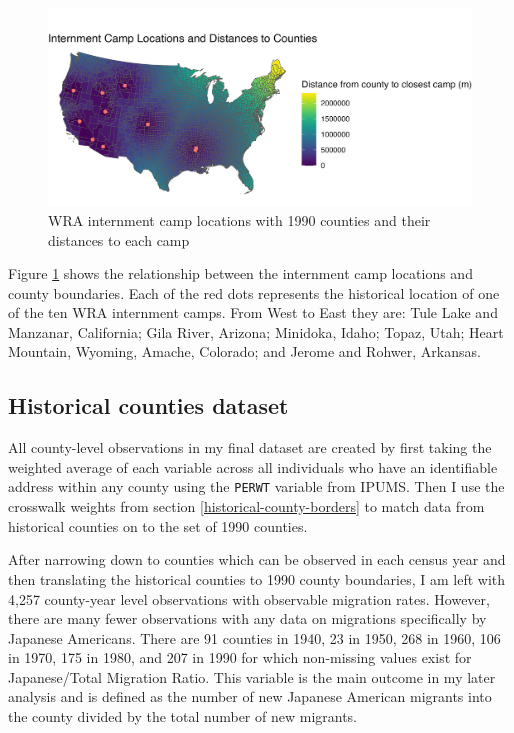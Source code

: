 \documentclass[12pt]{article}
\begin{document}
\begin{figure}[H]
    \centering
    \includegraphics[width=1.0\textwidth]{figures/countymap.png}
    \caption{WRA internment camp locations with 1990 counties and their distances to each camp}
    \label{fig:countymap}
\end{figure}

Figure \ref{fig:countymap} shows the relationship between the internment camp locations and county boundaries. 
Each of the red dots represents the historical location of one of the ten WRA internment camps. 
From West to East they are:
Tule Lake and Manzanar, California;
Gila River, Arizona;
Minidoka, Idaho;
Topaz, Utah;
Heart Mountain, Wyoming,
Amache, Colorado;
and
Jerome and Rohwer, Arkansas.

\subsection{Historical counties
dataset}\label{historical-counties-dataset}


All county-level observations in my final dataset are created by first taking the weighted average of each variable across all individuals who have an identifiable address within any county 
using the \texttt{PERWT} variable from IPUMS. 
Then I use the crosswalk weights from section \ref{historical-county-borders} to match data from historical counties on to the set of 1990 counties. 

After narrowing down to counties which can be observed in each census
year and then translating the historical counties to 1990 county
boundaries, I am left with 4,257 county-year level observations with observable migration rates.
However, there are many fewer observations with any data on migrations specifically by Japanese Americans.
There are 91 counties in 1940, 23 in 1950, 268 in 1960, 106 in 1970, 175 in 1980, and 207 in 1990 for which non-missing values exist for Japanese/Total Migration Ratio.
This variable is the main outcome in my later analysis and is defined as the number of new Japanese American migrants into the county divided by the total number of new migrants.
\end{document}
